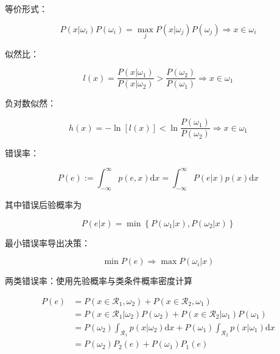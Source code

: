 \documentclass[openany,a4paper,12pt]{ctexbook}
\theoremstyle{kaiti}
\theoremstyle{normal}
\begin{document}
等价形式：

\begin{equation}
P\left(x|\omega_i \right)P\left(\omega_i \right)=\max_jP\left(x|\omega_j \right)P\left(\omega_j \right)\Rightarrow x\in \omega_i
\end{equation}

似然比：

\begin{equation}
l(x)=\frac{P\left(x|\omega_1 \right)}{P\left(x|\omega_2 \right)} >\frac{P\left(\omega_2 \right)}{P\left(\omega_1 \right)} \Rightarrow x\in \omega_1
\end{equation}

负对数似然：

\begin{equation}
h(x)=-\ln \left[l(x)\right] <\ln \frac{P\left(\omega_1 \right)}{P\left(\omega_2 \right)} \Rightarrow x\in \omega_1
\end{equation}

错误率：

\begin{equation}
P\left(e \right):=\int_{-\infty}^{\infty}{p\left(e,x \right)\mathrm{d}x}=\int_{-\infty}^{\infty}{P\left(e|x \right)p(x)\mathrm{d}x}
\end{equation}

其中错误后验概率为 

\begin{equation}
P\left(e|x \right)=\min \left\{ P\left(\omega_1|x \right), P\left(\omega_2|x \right)\right\}
\end{equation}

最小错误率导出决策：

\begin{equation}
\min P\left(e \right)\Rightarrow \max P\left(\omega_i|x \right)
\end{equation}

两类错误率：使用先验概率与类条件概率密度计算

\begin{equation}
\begin{aligned}
  P\left(e \right)&=P\left(x\in \mathcal{R}_1,\omega_2 \right)+P\left(x\in \mathcal{R}_2,\omega_1 \right)\\
  &=P\left(x\in \mathcal{R}_1|\omega_2 \right)P\left(\omega_2 \right)+P\left(x\in \mathcal{R}_2|\omega_1 \right)P\left(\omega_1 \right)\\
  &=P\left(\omega_2 \right)\int_{\mathcal{R}_1}{p\left(x|\omega_2 \right)}\mathrm{d}x+P\left(\omega_1 \right)\int_{\mathcal{R}_2}{p\left(x|\omega_1 \right)}\mathrm{d}x\\
  &=P\left(\omega_2 \right)P_2\left(e \right)+P\left(\omega_1 \right)P_1\left(e \right)   
\end{aligned}
\end{equation}
\end{document}
